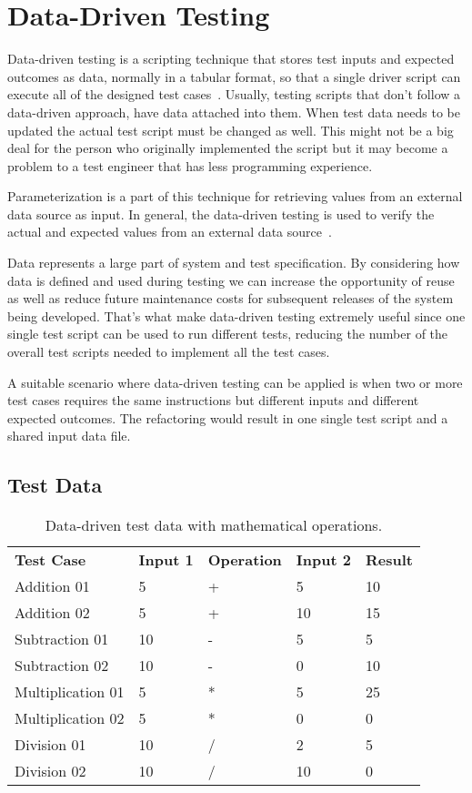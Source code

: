 \section{Data-Driven Testing}

Data-driven testing is a scripting technique that stores test inputs and
expected outcomes as data, normally in a tabular format, so that a single
driver script can execute all of the designed test cases~\cite{Fewster99}.
Usually, testing scripts that don't follow a data-driven approach, have data
attached into them. When test data needs to be updated the actual test script
must be changed as well. This might not be a big deal for the person who
originally implemented the script but it may become a problem to a test engineer
that has less programming experience.

Parameterization is a part of this technique for retrieving values from
an external data source as input. In general, the data-driven testing is used to
verify the actual and expected values from an external data source~\cite{Sams:2015}.

Data represents a large part of system and test specification. By considering
how data is defined and used during testing we can increase the opportunity
of reuse as well as reduce future maintenance costs for subsequent releases of
the system being developed. That's what make data-driven testing extremely
useful since one single test script can be used to run different tests, reducing
the number of the overall test scripts needed to implement all the test cases.

A suitable scenario where data-driven testing can be applied is when two or more
test cases requires the same instructions but different inputs and different
expected outcomes. The refactoring would result in one single test script and a
shared input data file.

\subsection{Test Data}

\begin{table}[!ht]
\centering
\begin{tabular}{lllll}
\textbf{Test Case} & \textbf{Input 1} & \textbf{Operation} & \textbf{Input 2} & \textbf{Result} \\
Addition 01 & 5 & + & 5 & 10 \\
Addition 02 & 5 & + & 10 & 15 \\
Subtraction 01 & 10 & - & 5 & 5 \\
Subtraction 02 & 10 & - & 0 & 10 \\
Multiplication 01 & 5 & * & 5 & 25 \\
Multiplication 02 & 5 & * & 0 & 0 \\
Division 01 & 10 & / & 2 & 5 \\
Division 02 & 10 & / & 10 & 0 \\
\end{tabular}
\caption{Data-driven test data with mathematical operations.}
\label{table:tab1}
\end{table}

